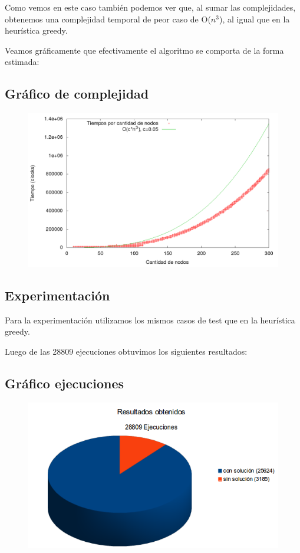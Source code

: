 Como vemos en este caso tambi\'en podemos ver que, al sumar las complejidades, obtenemos una complejidad temporal de
peor caso de O($n^3$), al igual que en la heur\'istica greedy.


Veamos gr\'aficamente que efectivamente el algoritmo se comporta de la forma estimada:

\subsection{Gr\'afico de complejidad}
\begin{figure}[!hp]
	\centering
 	\includegraphics[scale=0.3]{img/bl_time.png}
\end{figure}


\newpage
\subsection{Experimentaci\'on}

Para la experimentaci\'on utilizamos los mismos casos de test que en la heur\'istica greedy.

Luego de las 28809 ejecuciones obtuvimos los siguientes resultados:

\subsection{Gr\'afico ejecuciones}
\begin{figure}[!hp]
	\centering
 	\includegraphics[scale=0.7]{img/bl_soluciones.png}
\end{figure}

